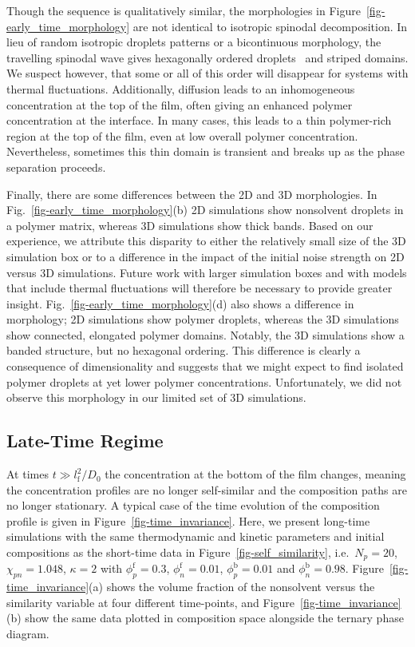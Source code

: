 \documentclass[journal=mamobx, layout=twocolumn]{achemso}
\newcommand{\txtf}{\mathrm{f}}
\newcommand{\txtb}{\mathrm{b}}
\begin{document}
Though the sequence is qualitatively similar, the morphologies in Figure~\ref{fig-early_time_morphology} are not identical to isotropic spinodal decomposition.
In lieu of random isotropic droplets patterns or a bicontinuous morphology, the travelling spinodal wave gives hexagonally ordered droplets~\cite{Paradiso2016} and striped domains.
We suspect however, that some or all of this order will disappear for systems with thermal fluctuations.
Additionally, diffusion leads to an inhomogeneous concentration at the top of the film, often giving an enhanced polymer concentration at the interface. 
In many cases, this leads to a thin polymer-rich region at the top of the film, even at low overall polymer concentration.
Nevertheless, sometimes this thin domain is transient and breaks up as the phase separation proceeds.

Finally, there are some differences between the 2D and 3D morphologies.
In Fig.~\ref{fig-early_time_morphology}(b) 2D simulations show nonsolvent droplets in a polymer matrix, whereas 3D simulations show thick bands.
Based on our experience, we attribute this disparity to either the relatively small size of the 3D simulation box or to a difference in the impact of the initial noise strength on 2D versus 3D simulations.
Future work with larger simulation boxes and with models that include thermal fluctuations will therefore be necessary to provide greater insight.
Fig.~\ref{fig-early_time_morphology}(d) also shows a difference in morphology; 2D simulations show polymer droplets, whereas the 3D simulations show connected, elongated polymer domains.
Notably, the 3D simulations show a banded structure, but no hexagonal ordering.
This difference is clearly a consequence of dimensionality and suggests that we might expect to find isolated polymer droplets at yet lower polymer concentrations.
Unfortunately, we did not observe this morphology in our limited set of 3D simulations.

\subsection{Late-Time Regime}
At times $t \gg l_{\txtf}^{2}/D_{0}$ the concentration at the bottom of the film changes, meaning the concentration profiles are no longer self-similar and the composition paths are no longer stationary.
A typical case of the time evolution of the composition profile is given in Figure~\ref{fig-time_invariance}.
Here, we present long-time simulations with the same thermodynamic and kinetic parameters and initial compositions as the short-time data in Figure~\ref{fig-self_similarity}, i.e.\ $N_{p} = 20$, $\chi_{pn} = 1.048$, $\kappa = 2$ with $\phi_{p}^{\txtf} = 0.3$, $\phi_{n}^{\txtf} = 0.01$,  $\phi_{p}^{\txtb} = 0.01$ and $\phi_{n}^{\txtb} = 0.98$.
Figure~\ref{fig-time_invariance}(a) shows the volume fraction of the nonsolvent versus the similarity variable at four different time-points, and Figure~\ref{fig-time_invariance}(b) show the same data plotted in composition space alongside the ternary phase diagram.
\end{document}
